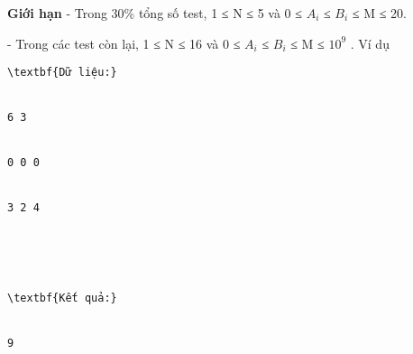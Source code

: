 \textbf{    Giới hạn   }
- Trong 30\% tổng số test, 1 ≤ N ≤ 5 và 0 ≤ $A_{i}$   ≤ $B_{i}$   ≤ M ≤ 20.  

   - Trong các test còn lại, 1 ≤ N ≤ 16 và 0 ≤ $A_{i}$   ≤ $B_{i}$   ≤ M ≤ $10^{9}$   .
Ví dụ
\begin{verbatim}
\textbf{Dữ liệu:}


6 3


0 0 0


3 2 4





\textbf{Kết quả:}


9\end{verbatim}
